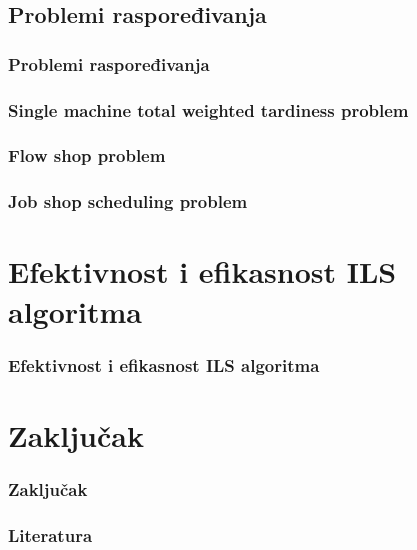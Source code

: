 \documentclass{beamer}
\begin{document}
\subsection{Problemi raspoređivanja}
\begin{frame}[fragile]\frametitle{Problemi raspoređivanja}
	\subsubsection{Single machine total weighted tardiness problem}
	\subsubsection{Flow shop problem}
	\subsubsection{Job shop scheduling problem}
\end{frame}

\section{Efektivnost i efikasnost ILS algoritma}
\begin{frame}[fragile]\frametitle{Efektivnost i efikasnost ILS algoritma}

\end{frame}

\section{Zaključak}
\begin{frame}[fragile]\frametitle{Zaključak}

\end{frame}

\begin{frame}[fragile]\frametitle{Literatura}
	\thispagestyle{empty}

\end{frame}
\end{document}
